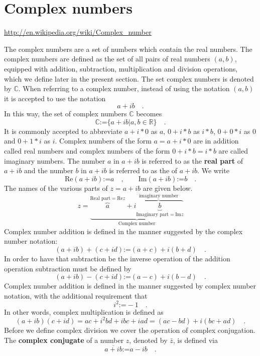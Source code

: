 \documentclass[12pt]{book}
\renewcommand{\Im}{\mathrm{Im}}
\renewcommand{\Re}{\mathrm{Re}}
\newcommand{\eqdef}{\textbf{:=}}
\renewcommand{\emph}{\textbf}
\begin{document}
\section{ Complex numbers}

\label{secComplexNumbers}

\noindent \url{http://en.wikipedia.org/wiki/Complex_number}

 The complex numbers are a set of numbers which contain the real numbers. The complex numbers are defined as the set of all pairs of real numbers $(a,b)$, equipped with addition, subtraction, multiplication and division operations, which we define later in the present section. The set complex numbers is denoted by $\mathbb C$. When referring to a complex number, instead of using the notation $(a,b)$ it is accepted to use the notation
\[
a+i b\quad .
\]
In this way, the set of complex numbers $\mathbb C$ becomes
\[
\mathbb C\eqdef \{a+ib| a,b\in \mathbb R\}\quad.
\]
It is commonly accepted to abbreviate $ a+i*0$ as $a$, $0+i*b$ as $i*b$, $0+0*i$ as $0$ and $0+1*i$ as $i$. Complex numbers of the form $a=a+i*0$ are in addition called real numbers and complex numbers of the form $0+i*b=i*b$ are called imaginary numbers.   The number $a$ in $a+ib$ is referred to as the \emph{real part} of $a+ib$ and the number $b$ in $a+ib$ is referred to as the of $a+ib$. We write
\[
\Re (a+ib)\eqdef a \quad, \quad \quad \Im (a+ib)\eqdef b \quad .
\]
The names of the various parts of $z=a+ib$ are given below.
\[
z=\underbrace{\overbrace{a}^{\text{Real part}=\Re z}+ \overbrace{i\underbrace{b}_{\text{Imaginary part}=\Im z}}^{\text{imaginary number}} }_{\text{Complex number}}
\]
Complex number addition is defined in the manner suggested by the complex number notation:
\[(a+i b)+ (c+id)\eqdef (a+c) + i(b+d) \quad .
\]
In order to have that subtraction be the inverse operation of the addition operation subtraction must be defined by
\[
(a+i b)- (c+id)\eqdef (a-c) + i(b-d) \quad .
\]
Complex number addition is defined in the manner suggested by complex number notation, with the additional requirement that
\[
i^2\eqdef -1\quad .
\]
In other words, complex multiplication is defined as
\[
(a+ i b)(c+id)=ac +i^2 bd +i bc + i ad= (ac-bd)+i(bc+ad) \quad .
\]
Before we define complex division we cover the operation of complex conjugation. The \emph{complex conjugate} of a number $z$, denoted by $\bar z$, is defined via
\[\overline{a+ib}\eqdef a-ib \quad .
\]
\end{document}
